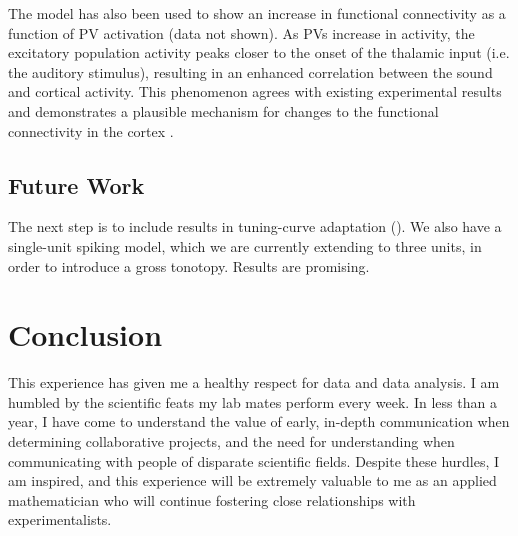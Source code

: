 \documentclass[a4paper,11pt]{article}
\begin{document}
The model has also been used to show an increase in functional connectivity as a function of PV activation (data not shown). As PVs increase in activity, the excitatory population activity peaks closer to the onset of the thalamic input (i.e. the auditory stimulus), resulting in an enhanced correlation between the sound and cortical activity. This phenomenon agrees with existing experimental results and demonstrates a plausible mechanism for changes to the functional connectivity in the cortex \cite{hamilton2013optogenetic}.

\subsection{Future Work}
  
The next step is to include results in tuning-curve adaptation (\cite{natan2017cortical}). We also have a single-unit spiking model, which we are currently extending to three units, in order to introduce a gross tonotopy. Results are promising.

\section{Conclusion}

This experience has given me a healthy respect for data and data analysis. I am humbled by the scientific feats my lab mates perform every week. In less than a year, I have come to understand the value of early, in-depth communication when determining collaborative projects, and the need for understanding when communicating with people of disparate scientific fields. Despite these hurdles, I am inspired, and this experience will be extremely valuable to me as an applied mathematician who will continue fostering close relationships with experimentalists.




\end{document}
